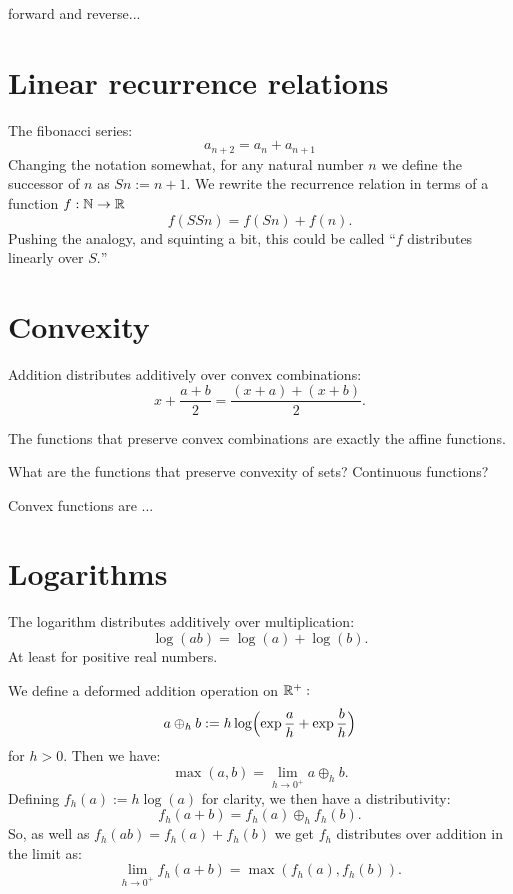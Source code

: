 \documentclass[11pt]{article}
\begin{document}
forward and reverse...
\cite{Colah2015}

\cite{Griewank2012}

%

%
%

\section{Linear recurrence relations}

The fibonacci series:
$$
    a_{n+2} = a_n + a_{n+1}
$$
Changing the notation somewhat, for any natural number $n$
we define the successor of $n$ as $Sn := n+1.$
We rewrite the recurrence relation in terms of a function $f:\mathbb N\to\mathbb R$
$$
    f(SSn) = f(Sn) + f(n).
$$
Pushing the analogy, and squinting a bit, this
could be called ``$f$ distributes linearly over $S.$''

%
%

\section{Convexity}

Addition distributes additively over convex
combinations:
$$
x + \frac{a+b}{2} = \frac{(x+a) + (x+b)}{2}.
$$

The functions that preserve convex combinations
are exactly the affine functions.

What are the functions that preserve convexity of sets? Continuous functions?

Convex functions are ...

%
%

\section{Logarithms}

The logarithm distributes additively over multiplication: 
$$\log(ab) = \log(a) + \log(b).$$
At least for positive real numbers.

We define a deformed addition operation on $\mathbb R^{+}:$
$$
    a\oplus_h b := h\log \Bigl( \exp\frac{a}{h} +\exp\frac{b}{h} \Bigr)
$$
for $h>0.$
Then we have:
$$
    \max(a, b) = \lim_{h\to 0^+} a\oplus_h b.
$$
Defining $f_h(a) := h\log(a)$ for clarity, we then
have a distributivity:
$$
    f_h(a+b) = f_h(a) \oplus_h f_h(b).
$$
So, as well as $f_h(ab) = f_h(a) + f_h(b)$ we
get $f_h$ distributes over addition in the limit as:
$$
    \lim_{h\to 0^+} f_h(a+b) = \max(f_h(a), f_h(b)).
$$
\end{document}
